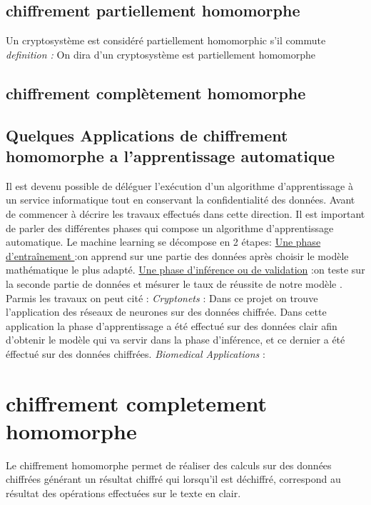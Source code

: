 \documentclass[a4paper,11pt]{report}
\begin{document}
\subsection{chiffrement partiellement homomorphe}
Un cryptosystème est considéré partiellement homomorphic s'il commute 
\textit{definition : } On dira d’un cryptosystème est partiellement homomorphe 
\subsection{chiffrement complètement homomorphe}
\subsection{Quelques Applications de chiffrement homomorphe a l'apprentissage automatique}
Il est devenu possible de déléguer l'exécution d'un algorithme d'apprentissage à un service informatique tout en conservant la confidentialité des données. \newline
Avant de commencer à décrire les travaux effectués dans cette direction. Il est important de parler des différentes phases qui compose un algorithme d'apprentissage automatique.\newline
Le machine learning se décompose en 2 étapes:\newline
\underline{Une phase d’entraînement }:\newline on apprend sur une partie des données après choisir le modèle mathématique le plus adapté.\newline 
\underline{Une phase d'inférence ou de validation} :\newline	 on teste sur la seconde partie de données et mésurer le taux de réussite de notre modèle .\newline
Parmis les travaux on peut cité :\newline
\textit{Cryptonets } : Dans ce projet on trouve l'application des réseaux de neurones sur des données chiffrée. \newline
Dans cette application la phase d'apprentissage a été effectué sur des données clair  afin d'obtenir le modèle qui va servir dans la phase d'inférence, et ce dernier a été éffectué sur des données chiffrées.    
\textit{Biomedical Applications } :
\newpage
\section{chiffrement completement homomorphe}
Le chiffrement homomorphe permet de réaliser des calculs sur des données chiffrées générant un résultat chiffré qui lorsqu'il est déchiffré, correspond au résultat des opérations effectuées sur le texte en clair. 
\end{document}
